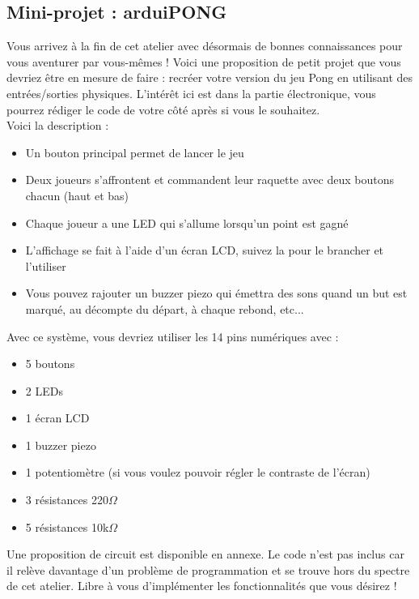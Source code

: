 \subsection{Mini-projet : arduiPONG}
Vous arrivez à la fin de cet atelier avec désormais de bonnes connaissances pour vous aventurer par vous-mêmes !
Voici une proposition de petit projet que vous devriez être en mesure de faire : recréer votre version du jeu Pong en utilisant des entrées/sorties physiques.
L'intérêt ici est dans la partie électronique, vous pourrez rédiger le code de votre côté après si vous le souhaitez.
\\
Voici la description :
\begin{itemize}
	\item Un bouton principal permet de lancer le jeu
	\item Deux joueurs s'affrontent et commandent leur raquette avec deux boutons chacun (haut et bas)
	\item Chaque joueur a une LED qui s'allume lorsqu'un point est gagné
	\item L'affichage se fait à l'aide d'un écran LCD, suivez la  pour le brancher et l'utiliser
	\item Vous pouvez rajouter un buzzer piezo qui émettra des sons quand un but est marqué, au décompte du départ, à chaque rebond, etc...
\end{itemize}

Avec ce système, vous devriez utiliser les 14 pins numériques avec :
\begin{itemize}
	\item 5 boutons
	\item 2 LEDs
	\item 1 écran LCD
	\item 1 buzzer piezo
	\item 1 potentiomètre (si vous voulez pouvoir régler le contraste de l'écran)
	\item 3 résistances 220$\Omega$
	\item 5 résistances 10k$\Omega$
\end{itemize}

\br
Une proposition de circuit est disponible en annexe.
Le code n'est pas inclus car il relève davantage d'un problème de programmation et se trouve hors du spectre de cet atelier.
Libre à vous d'implémenter les fonctionnalités que vous désirez !
